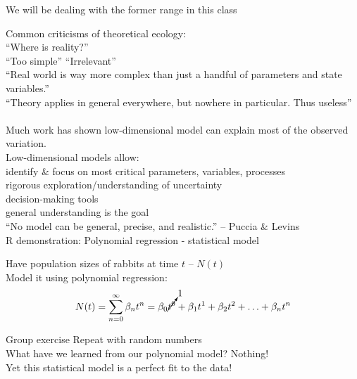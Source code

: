 \documentclass{article}
\newcommand{\note}[1]{\colorbox{gray!20}{#1}}
\begin{document}
We will be dealing with the former range in this class

Common criticisms of theoretical ecology:\\
\-\hspace{1cm}``Where is reality?''\\
\-\hspace{1cm}``Too simple'' ``Irrelevant''\\
\-\hspace{1cm}``Real world is way more complex than just a handful of parameters and state variables.''\\
\-\hspace{1cm}``Theory applies in general everywhere, but nowhere in particular.  Thus useless''
\\
\\
Much work has shown low-dimensional model can explain most of the observed variation.\\
Low-dimensional models allow:\\
\-\hspace{1cm}  identify \& focus on most critical parameters, variables, processes\\
\-\hspace{1cm} rigorous exploration/understanding of uncertainty\\
\-\hspace{1cm}decision-making tools\\
\-\hspace{1cm}general understanding is the goal\\

``No model can be general, precise, and realistic.'' -- Puccia \& Levins\\


\note{R demonstration: Polynomial regression - statistical model}


Have population sizes of rabbits at time $t$ -- $N(t)$\\
Model it using polynomial regression:\\
\begin{equation*}
	N(t) = \sum_{n=0}^\infty \beta_n t^n = \beta_0 \cancelto{1}{t^0} + \beta_1 t^1 + \beta_2 t^2 + \ldots + \beta_n t^n
\end{equation*}

\note{Group exercise}
Repeat with random numbers\\
What have we learned from our polynomial model?  Nothing!\\
Yet this statistical model is a perfect fit to the data!\\
\end{document}
